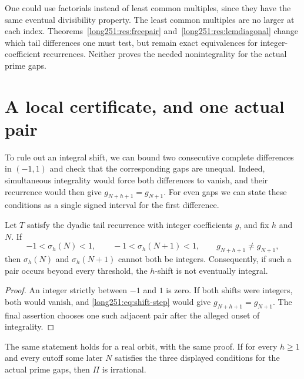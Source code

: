 One could use factorials instead of least common multiples, since they
have the same eventual divisibility property.  The least common multiples
are no larger at each index.  Theorems~\ref{long251:res:freepair}
and~\ref{long251:res:lcmdiagonal} change which tail differences one must
test, but remain exact equivalences for integer-coefficient recurrences.
Neither proves the needed nonintegrality for the actual prime gaps.

\section{A local certificate, and one actual pair}\label{long251:sec:local-certificate}

To rule out an integral shift, we can bound two consecutive complete
differences in $(-1,1)$ and check that the corresponding gaps are unequal.
Indeed, simultaneous integrality would force both differences to vanish,
and their recurrence would then give $g_{N+h+1}=g_{N+1}$.
For even gaps we can state these conditions as a single signed interval
for the first difference.

\begin{theorem}\label{long251:res:smallpair}
Let $T$ satisfy the dyadic tail recurrence with integer coefficients $g$, and fix
$h$ and $N$.  If
\[
 -1<\sigma_h(N)<1,\qquad -1<\sigma_h(N+1)<1,
 \qquad g_{N+h+1}\ne g_{N+1},
\]
then $\sigma_h(N)$ and $\sigma_h(N+1)$ cannot both be integers.  Consequently,
if such a pair occurs beyond every threshold, the $h$-shift is not eventually
integral.
\end{theorem}

\begin{proof}
An integer strictly between $-1$ and $1$ is zero.  If both shifts were
integers, both would vanish, and \eqref{long251:eq:shift-step} would give
$g_{N+h+1}=g_{N+1}$.  The final assertion chooses one such adjacent pair
after the alleged onset of integrality.
\end{proof}

\begin{corollary}\label{long251:res:smallpair-real}
The same statement holds for a real orbit, with the same proof.  If for every
$h\ge1$ and every cutoff some later $N$ satisfies the three displayed
conditions for the actual prime gaps, then $\Pi$ is irrational.
\end{corollary}

